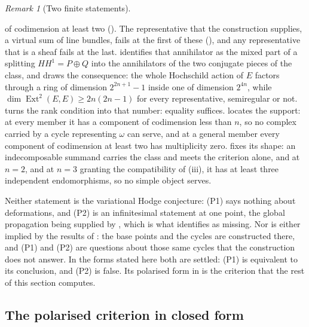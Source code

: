 \documentclass[11pt,reqno]{amsart}
\theoremstyle{plain}
\theoremstyle{definition}
\theoremstyle{remark}
\newtheorem{remark}[theorem]{Remark}
\DeclareMathOperator{\Ext}{Ext}
\begin{document}
\begin{remark}[Two finite statements]
\begin{enumerate}[label=\textup{(P\arabic*)},leftmargin=*]
  of codimension at least two (). The representative that
  the construction supplies, a virtual sum of line bundles, fails at the first
  of these (\cite[Proposition~9.10]{paperI}), and any representative that is a
  sheaf fails at the last.  identifies that
  annihilator as the mixed part of a splitting $HH^{1}=P\oplus Q$ into the
  annihilators of the two conjugate pieces of the class, and
   draws the consequence: the whole Hochschild action of
  $E$ factors through a ring of dimension $2^{2n+1}-1$ inside one of
  dimension $2^{4n}$, while $\dim\Ext^{2}(E,E)\ge2n(2n-1)$ for every
  representative, semiregular or not.  turns the rank
  condition into that number: equality suffices.  locates
  the support: at every member it has a component of codimension less than
  $n$, so no complex carried by a cycle representing $\omega$ can serve, and
  at a general member every component of codimension at least two has
  multiplicity zero.
   fixes its shape: an indecomposable summand carries the
  class and meets the criterion alone, and at $n=2$, and at $n=3$ granting
  the compatibility of (iii), it has at least three
  independent endomorphisms, so no simple object serves.
\end{enumerate}

Neither statement is the variational Hodge conjecture: (P1) says nothing
about deformations, and (P2) is an infinitesimal statement at one point, the
global propagation being supplied by \cite[Theorem~16.4]{paperI}, which is what
\cite[Remark~B.11]{paperI} identifies as missing. Nor is either implied by the
results of \cite[Section~15.5]{paperI}: the base points and the cycles are
constructed there, and (P1) and (P2) are questions about those same cycles
that the construction does not answer. In the forms stated here both are
settled: (P1) is equivalent to its conclusion, and (P2) is false. Its
polarised form in  is the criterion that the rest of this
section computes.
\end{remark}

\subsection{The polarised criterion in closed form}
\end{document}
